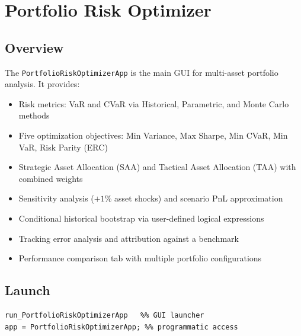\documentclass[11pt,a4paper]{article}
\begin{document}
\section{Portfolio Risk Optimizer}

\subsection{Overview}
The \texttt{PortfolioRiskOptimizerApp} is the main GUI for multi-asset portfolio analysis. It provides:
\begin{itemize}[leftmargin=2em]
  \item Risk metrics: VaR and CVaR via Historical, Parametric, and Monte Carlo methods
  \item Five optimization objectives: Min Variance, Max Sharpe, Min CVaR, Min VaR, Risk Parity (ERC)
  \item Strategic Asset Allocation (SAA) and Tactical Asset Allocation (TAA) with combined weights
  \item Sensitivity analysis ($+1$\% asset shocks) and scenario PnL approximation
  \item Conditional historical bootstrap via user-defined logical expressions
  \item Tracking error analysis and attribution against a benchmark
  \item Performance comparison tab with multiple portfolio configurations
\end{itemize}

\subsection{Launch}
\begin{lstlisting}
run_PortfolioRiskOptimizerApp   %% GUI launcher
app = PortfolioRiskOptimizerApp; %% programmatic access
\end{lstlisting}
\end{document}
